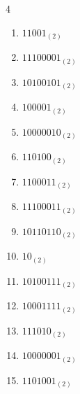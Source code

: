 \begin{multicols}{4}
\begin{enumerate}
        \phantom{$=196$}

  \item $11001_{(2)}$

        \phantom{$=25$}

\columnbreak %

  \item $11100001_{(2)}$

        \phantom{$=225$}

  \item $10100101_{(2)}$

        \phantom{$=165$}

  \item $100001_{(2)}$

        \phantom{$=33$}

  \item $10000010_{(2)}$

        \phantom{$=130$}

  \item $110100_{(2)}$

        \phantom{$=52$}

  \item $1100011_{(2)}$

        \phantom{$=99$}

  \item $11100011_{(2)}$

        \phantom{$=227$}

  \item $10110110_{(2)}$

        \phantom{$=182$}

  \item $10_{(2)}$

        \phantom{$=2$}

  \item $10100111_{(2)}$

        \phantom{$=167$}

  \item $10001111_{(2)}$

        \phantom{$=143$}

  \item $111010_{(2)}$

        \phantom{$=58$}

  \item $10000001_{(2)}$

        \phantom{$=129$}

  \item $1101001_{(2)}$


\end{enumerate}
\end{multicols}

